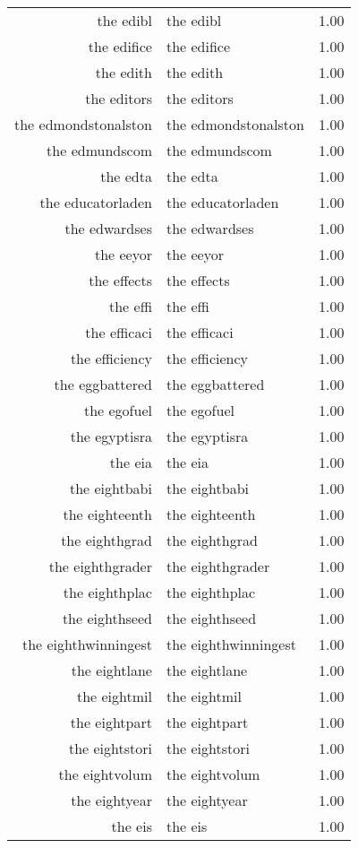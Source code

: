 \begin{table}[ht]
\begin{tabular}{rlr}
  the edibl & the edibl & 1.00 \\ 
  the edifice & the edifice & 1.00 \\ 
  the edith & the edith & 1.00 \\ 
  the editors & the editors & 1.00 \\ 
  the edmondstonalston & the edmondstonalston & 1.00 \\ 
  the edmundscom & the edmundscom & 1.00 \\ 
  the edta & the edta & 1.00 \\ 
  the educatorladen & the educatorladen & 1.00 \\ 
  the edwardses & the edwardses & 1.00 \\ 
  the eeyor & the eeyor & 1.00 \\ 
  the effects & the effects & 1.00 \\ 
  the effi & the effi & 1.00 \\ 
  the efficaci & the efficaci & 1.00 \\ 
  the efficiency & the efficiency & 1.00 \\ 
  the eggbattered & the eggbattered & 1.00 \\ 
  the egofuel & the egofuel & 1.00 \\ 
  the egyptisra & the egyptisra & 1.00 \\ 
  the eia & the eia & 1.00 \\ 
  the eightbabi & the eightbabi & 1.00 \\ 
  the eighteenth & the eighteenth & 1.00 \\ 
  the eighthgrad & the eighthgrad & 1.00 \\ 
  the eighthgrader & the eighthgrader & 1.00 \\ 
  the eighthplac & the eighthplac & 1.00 \\ 
  the eighthseed & the eighthseed & 1.00 \\ 
  the eighthwinningest & the eighthwinningest & 1.00 \\ 
  the eightlane & the eightlane & 1.00 \\ 
  the eightmil & the eightmil & 1.00 \\ 
  the eightpart & the eightpart & 1.00 \\ 
  the eightstori & the eightstori & 1.00 \\ 
  the eightvolum & the eightvolum & 1.00 \\ 
  the eightyear & the eightyear & 1.00 \\ 
  the eis & the eis & 1.00 \\ 

\end{tabular}
\end{table}
